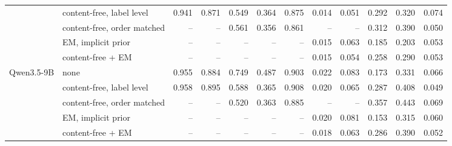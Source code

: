 \begin{tabular}{llrrrrrrrrrr}
 & content-free, label level & 0.941 & 0.871 & 0.549 & 0.364 & 0.875 & 0.014 & 0.051 & 0.292 & 0.320 & 0.074 \\
 & content-free, order matched & -- & -- & 0.561 & 0.356 & 0.861 & -- & -- & 0.312 & 0.390 & 0.050 \\
 & EM, implicit prior & -- & -- & -- & -- & -- & 0.015 & 0.063 & 0.185 & 0.203 & 0.053 \\
 & content-free + EM & -- & -- & -- & -- & -- & 0.015 & 0.054 & 0.258 & 0.290 & 0.053 \\
\midrule
Qwen3.5-9B & none & 0.955 & 0.884 & 0.749 & 0.487 & 0.903 & 0.022 & 0.083 & 0.173 & 0.331 & 0.066 \\
 & content-free, label level & 0.958 & 0.895 & 0.588 & 0.365 & 0.908 & 0.020 & 0.065 & 0.287 & 0.408 & 0.049 \\
 & content-free, order matched & -- & -- & 0.520 & 0.363 & 0.885 & -- & -- & 0.357 & 0.443 & 0.069 \\
 & EM, implicit prior & -- & -- & -- & -- & -- & 0.020 & 0.081 & 0.153 & 0.315 & 0.060 \\
 & content-free + EM & -- & -- & -- & -- & -- & 0.018 & 0.063 & 0.286 & 0.390 & 0.052 \\
\bottomrule
\end{tabular}
